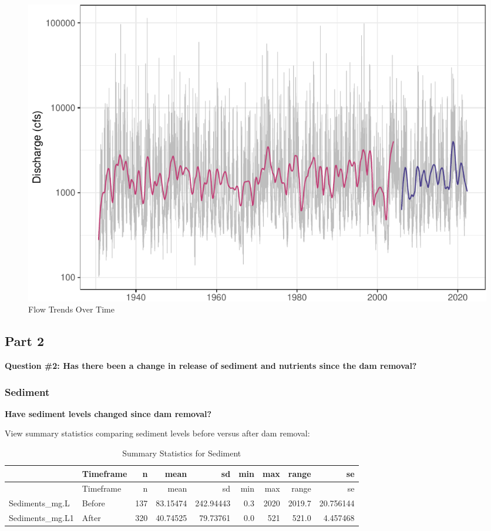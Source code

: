 \documentclass[
  12pt,
]{article}
\begin{document}
\begin{figure}
\centering
\includegraphics{Project_Script_files/figure-latex/flow_ts_graph-1.pdf}
\caption{Flow Trends Over Time}
\end{figure}

\newpage

\hypertarget{part-2}{%
\subsection{Part 2}\label{part-2}}

\textbf{Question \#2: Has there been a change in release of sediment and
nutrients since the dam removal?}

\hypertarget{sediment}{%
\subsubsection{Sediment}\label{sediment}}

\textbf{Have sediment levels changed since dam removal?}

View summary statistics comparing sediment levels before versus after
dam removal:

\begin{longtable}[]{@{}llrrrrrrr@{}}
\caption{Summary Statistics for Sediment}\tabularnewline
\toprule
& Timeframe & n & mean & sd & min & max & range & se \\
\midrule
\endfirsthead
\toprule
& Timeframe & n & mean & sd & min & max & range & se \\
\midrule
\endhead
Sediments\_mg.L & Before & 137 & 83.15474 & 242.94443 & 0.3 & 2020 &
2019.7 & 20.756144 \\
Sediments\_mg.L1 & After & 320 & 40.74525 & 79.73761 & 0.0 & 521 & 521.0
& 4.457468 \\
\bottomrule
\end{longtable}
\end{document}
